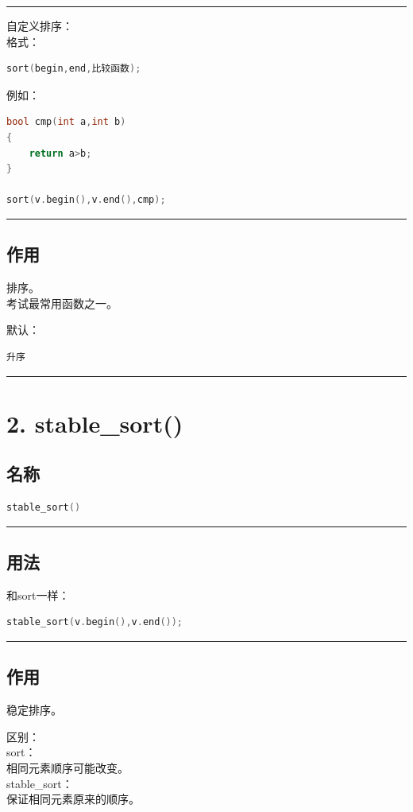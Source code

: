 \documentclass[9pt,twocolumn]{extarticle}
\begin{document}
\noindent\rule{\linewidth}{0.4pt}

自定义排序：\\
格式：
\begin{lstlisting}[language=C++]
sort(begin,end,比较函数);
\end{lstlisting}
例如：
\begin{lstlisting}[language=C++]
bool cmp(int a,int b)
{
    return a>b;
}

sort(v.begin(),v.end(),cmp);
\end{lstlisting}

\noindent\rule{\linewidth}{0.4pt}

\subsection{作用}
排序。\\
考试最常用函数之一。

默认：
\begin{lstlisting}
升序
\end{lstlisting}

\noindent\rule{\linewidth}{0.4pt}

\section{2. stable\_sort()}

\subsection{名称}
\begin{lstlisting}[language=C++]
stable_sort()
\end{lstlisting}

\noindent\rule{\linewidth}{0.4pt}

\subsection{用法}
和sort一样：
\begin{lstlisting}[language=C++]
stable_sort(v.begin(),v.end());
\end{lstlisting}

\noindent\rule{\linewidth}{0.4pt}

\subsection{作用}
稳定排序。

区别：\\
sort：\\
相同元素顺序可能改变。\\
stable\_sort：\\
保证相同元素原来的顺序。
\end{document}
